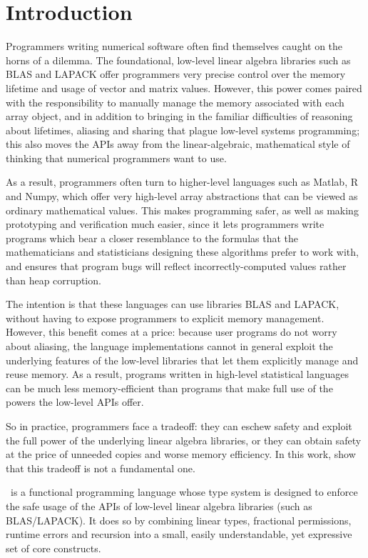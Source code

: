 \section{Introduction}

Programmers writing numerical software often find themselves caught on
the horns of a dilemma. The foundational, low-level linear algebra
libraries such as BLAS and LAPACK offer programmers very precise
control over the memory lifetime and usage of vector and matrix
values. However, this power comes paired with the responsibility to
manually manage the memory associated with each array object, and in
addition to bringing in the familiar difficulties of reasoning about
lifetimes, aliasing and sharing that plague low-level systems
programming; this also moves the APIs away from the linear-algebraic,
mathematical style of thinking that numerical programmers want to use.

As a result, programmers often turn to higher-level languages such as
Matlab, R and Numpy, which offer very high-level array abstractions
that can be viewed as ordinary mathematical values. This makes
programming safer, as well as making prototyping and verification much
easier, since it lets programmers write programs which bear a closer
resemblance to the formulas that the mathematicians and statisticians
designing these algorithms prefer to work with, and ensures that
program bugs will reflect incorrectly-computed values rather than heap
corruption.

The intention is that these languages can use libraries BLAS and
LAPACK, without having to expose programmers to explicit memory
management. However, this benefit comes at a price: because user
programs do not worry about aliasing, the language implementations
cannot in general exploit the underlying features of the low-level
libraries that let them explicitly manage and reuse memory. As a
result, programs written in high-level statistical languages can
be much less memory-efficient than programs that make full use
of the powers the low-level APIs offer. 

So in practice, programmers face a tradeoff: they can eschew safety
and exploit the full power of the underlying linear algebra libraries,
or they can obtain safety at the price of unneeded copies and worse
memory efficiency. In this work, show that this tradeoff is not a
fundamental one.

\lang\ is a functional programming language whose type system is
designed to enforce the safe usage of the APIs of low-level linear algebra
libraries (such as BLAS/LAPACK).  It does so by combining linear types,
fractional permissions, runtime errors and recursion into a small, easily
understandable, yet expressive set of core constructs.

